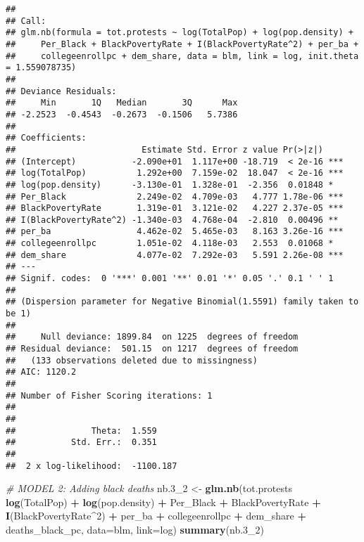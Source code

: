 \documentclass[
]{article}
\newenvironment{Shaded}{\begin{snugshade}}{\end{snugshade}}
\newcommand{\CommentTok}[1]{\textcolor[rgb]{0.56,0.35,0.01}{\textit{#1}}}
\newcommand{\DataTypeTok}[1]{\textcolor[rgb]{0.13,0.29,0.53}{#1}}
\newcommand{\DecValTok}[1]{\textcolor[rgb]{0.00,0.00,0.81}{#1}}
\newcommand{\FloatTok}[1]{\textcolor[rgb]{0.00,0.00,0.81}{#1}}
\newcommand{\KeywordTok}[1]{\textcolor[rgb]{0.13,0.29,0.53}{\textbf{#1}}}
\newcommand{\NormalTok}[1]{#1}
\newcommand{\OperatorTok}[1]{\textcolor[rgb]{0.81,0.36,0.00}{\textbf{#1}}}
\newcommand{\StringTok}[1]{\textcolor[rgb]{0.31,0.60,0.02}{#1}}
\begin{document}
\begin{verbatim}
## 
## Call:
## glm.nb(formula = tot.protests ~ log(TotalPop) + log(pop.density) + 
##     Per_Black + BlackPovertyRate + I(BlackPovertyRate^2) + per_ba + 
##     collegeenrollpc + dem_share, data = blm, link = log, init.theta = 1.559078735)
## 
## Deviance Residuals: 
##     Min       1Q   Median       3Q      Max  
## -2.2523  -0.4543  -0.2673  -0.1506   5.7386  
## 
## Coefficients:
##                         Estimate Std. Error z value Pr(>|z|)    
## (Intercept)           -2.090e+01  1.117e+00 -18.719  < 2e-16 ***
## log(TotalPop)          1.292e+00  7.159e-02  18.047  < 2e-16 ***
## log(pop.density)      -3.130e-01  1.328e-01  -2.356  0.01848 *  
## Per_Black              2.249e-02  4.709e-03   4.777 1.78e-06 ***
## BlackPovertyRate       1.319e-01  3.121e-02   4.227 2.37e-05 ***
## I(BlackPovertyRate^2) -1.340e-03  4.768e-04  -2.810  0.00496 ** 
## per_ba                 4.462e-02  5.465e-03   8.163 3.26e-16 ***
## collegeenrollpc        1.051e-02  4.118e-03   2.553  0.01068 *  
## dem_share              4.077e-02  7.292e-03   5.591 2.26e-08 ***
## ---
## Signif. codes:  0 '***' 0.001 '**' 0.01 '*' 0.05 '.' 0.1 ' ' 1
## 
## (Dispersion parameter for Negative Binomial(1.5591) family taken to be 1)
## 
##     Null deviance: 1899.84  on 1225  degrees of freedom
## Residual deviance:  501.15  on 1217  degrees of freedom
##   (133 observations deleted due to missingness)
## AIC: 1120.2
## 
## Number of Fisher Scoring iterations: 1
## 
## 
##               Theta:  1.559 
##           Std. Err.:  0.351 
## 
##  2 x log-likelihood:  -1100.187
\end{verbatim}

\begin{Shaded}
\begin{Highlighting}[]
\CommentTok{# MODEL 2: Adding black deaths}
\NormalTok{nb}\FloatTok{.3}\NormalTok{_}\DecValTok{2}\NormalTok{ <-}\StringTok{ }\KeywordTok{glm.nb}\NormalTok{(tot.protests }\OperatorTok{~}\StringTok{ }\KeywordTok{log}\NormalTok{(TotalPop) }\OperatorTok{+}\StringTok{ }\KeywordTok{log}\NormalTok{(pop.density) }\OperatorTok{+}\StringTok{ }\NormalTok{Per_Black }\OperatorTok{+}\StringTok{ }\NormalTok{BlackPovertyRate }\OperatorTok{+}\StringTok{ }\KeywordTok{I}\NormalTok{(BlackPovertyRate}\OperatorTok{^}\DecValTok{2}\NormalTok{) }\OperatorTok{+}\StringTok{ }\NormalTok{per_ba }\OperatorTok{+}\StringTok{ }\NormalTok{collegeenrollpc }\OperatorTok{+}\StringTok{ }\NormalTok{dem_share }\OperatorTok{+}\StringTok{ }\NormalTok{deaths_black_pc, }\DataTypeTok{data=}\NormalTok{blm, }\DataTypeTok{link=}\NormalTok{log)}
\KeywordTok{summary}\NormalTok{(nb}\FloatTok{.3}\NormalTok{_}\DecValTok{2}\NormalTok{) }
\end{Highlighting}
\end{Shaded}
\end{document}
